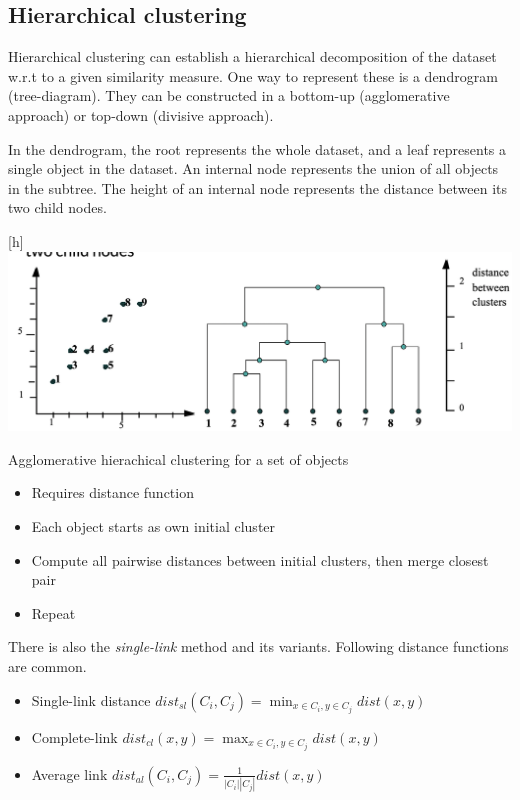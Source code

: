\subsection{Hierarchical clustering}
Hierarchical clustering can establish a hierarchical decomposition of the dataset w.r.t to a given similarity measure. One way to represent these is a dendrogram (tree-diagram). They can be constructed in a bottom-up (agglomerative approach) or top-down (divisive approach). 

In the dendrogram, the root represents the whole dataset, and a leaf represents a single object in the dataset. An internal node represents the union of all objects in the subtree. The height of an internal node represents the distance between its two child nodes. 

\begin{center}[h]
    \includegraphics[width=1\textwidth]{images/dendogram.png}
\end{center}

Agglomerative hierachical clustering for a set of objects
\begin{itemize}
    \item Requires distance function
    \item Each object starts as own initial cluster
    \item Compute all pairwise distances between initial clusters, then merge closest pair
    \item Repeat
\end{itemize}

There is also the \emph{single-link} method and its variants. Following distance functions are common.
\begin{itemize}
    \item Single-link distance $dist_{sl}(C_i, C_j) = \min_{x \in C_i, y \in C_j} dist(x, y)$
    \item Complete-link $dist_{cl}(x, y) = \max_{x \in C_i, y \in C_j} dist(x, y)$
    \item Average link $dist_{al}(C_i, C_j) = \frac{1}{|C_i||C_j|} dist(x,y)$
\end{itemize}

